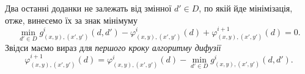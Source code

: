 Два останні доданки не залежать від змінної $d' \in D$, по якій йде мінімізація,
отже, винесемо їх за знак мінімуму
\begin{equation*}
    \min \limits_{d' \in D}
        g_{\left(x, y \right), \left(x', y' \right)}^{i} \left( d, d' \right) -
    \varphi_{\left(x, y \right), \left(x', y' \right)}^{i} \left( d \right) +
    \varphi_{\left(x, y \right), \left(x', y' \right)}^{i + 1} \left( d \right) =
    0.
\end{equation*}
Звідси маємо вираз для \textit{першого кроку алгоритму дифузії}
\begin{equation*}
    \varphi_{\left(x, y \right), \left(x', y' \right)}^{i + 1} \left( d \right) =
    \varphi_{\left(x, y \right), \left(x', y' \right)}^{i} \left( d \right) -
    \min \limits_{d' \in D}
        g_{\left(x, y \right), \left(x', y' \right)}^{i} \left( d, d' \right).
\end{equation*}

